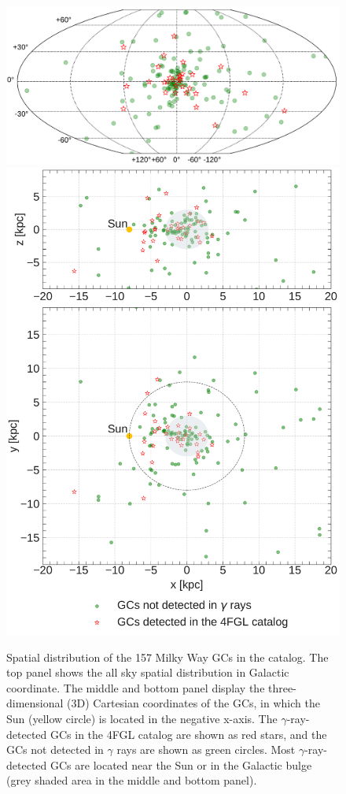 \documentclass[doublespace,draft,nopageskip]{VTthesis} %
\begin{document}
\begin{figure}
    \centering
    \includegraphics[width=\columnwidth]{Figures/Globular/AllSky_map.pdf} \\
    \includegraphics[width=\columnwidth]{Figures/Globular/distance_map.pdf}
    \caption{Spatial distribution of the 157 Milky Way GCs in the \citet{1996AJ....112.1487H} catalog. The top panel shows  the all sky spatial distribution in Galactic coordinate. The middle and bottom panel display the three-dimensional (3D) Cartesian %
    coordinates of the GCs, in which %
    the Sun (yellow circle) is located in the negative x-axis. The $\gamma$-ray-detected GCs in the 4FGL catalog are shown as red stars, %
    and the GCs not detected in $\gamma$ rays are shown as green circles. Most $\gamma$-ray-detected GCs are located near the Sun or in the Galactic bulge (grey shaded area in the middle and bottom panel).}
    \label{fig:all_sky_distribution}
\end{figure}
\end{document}
